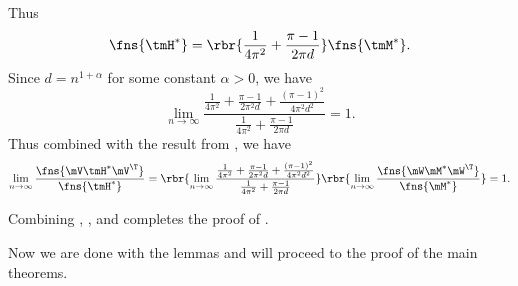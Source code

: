 \begin{proofof}{}
\begin{proofof}{}
\begin{equation}
\end{equation}
Thus\begin{equation}
    \fns{\tmH^*} = \rbr{\frac{1}{4\pi^2} + \frac{\pi-1}{2\pi d}}\fns{\tmM^*}.
\end{equation}
Since $d=n^{1+\alpha}$ for some constant $\alpha>0$, we have 
\begin{equation}
    \lim_{n\to\infty}\frac{\frac{1}{4\pi^2} + \frac{\pi-1}{2\pi^2 d} + \frac{(\pi-1)^2}{4\pi^2d^2}}{\frac{1}{4\pi^2} + \frac{\pi-1}{2\pi d}} = 1.
\end{equation}
Thus combined with the result from , we have\begin{equation}
    \lim_{n\to\infty}\frac{\fns{\mV\tmH^*\mV^\T}}{\fns{\tmH^*}} = \rbr{\lim_{n\to\infty}\frac{\frac{1}{4\pi^2} + \frac{\pi-1}{2\pi^2 d} + \frac{(\pi-1)^2}{4\pi^2d^2}}{\frac{1}{4\pi^2} + \frac{\pi-1}{2\pi d}}}\rbr{\lim_{n\to\infty}\frac{\fns{\mW\mM^*\mW^\T}}{\fns{\mM^*}}} = 1.
\end{equation}
\end{proofof}

Combining , , and  completes the proof of .
\end{proofof}

Now we are done with the lemmas and will proceed to the proof of the main theorems.